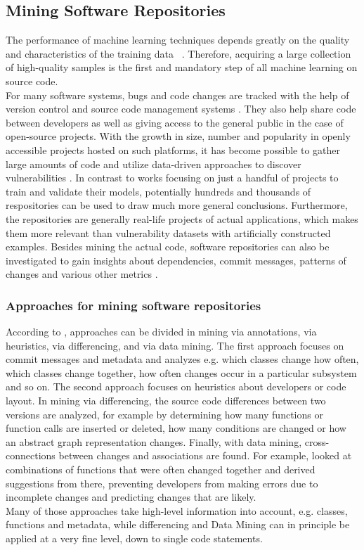 \documentclass[
a4paper,
pagesize,
pdftex,
12pt,
twoside, %
BCOR=5mm, %
ngerman,
fleqn,
final,
]{scrartcl}
\begin{document}
	\subsection{Mining Software Repositories}\label{Mining-Software-Repositories}
	The performance of machine learning techniques depends greatly on the quality and characteristics of the training data ~\cite{Pang.2015}. Therefore, acquiring a large collection of high-quality samples is the first and mandatory step of all machine learning on source code.\\
	For many software systems, bugs and code changes are tracked with the help of version control and source code management systems \cite{Zhou.2017}. They also help share code between developers as well as giving access to the general public in the case of open-source projects. With the growth in size, number and popularity in openly accessible projects hosted on such platforms, it has become possible to gather large amounts of code and utilize data-driven approaches to discover vulnerabilities \cite{Russell.2018}. In contrast to works focusing on just a handful of projects to train and validate their models, potentially hundreds and thousands of respositories can be used to draw much more general conclusions. Furthermore, the repositories are generally real-life projects of actual applications, which makes them more relevant than vulnerability datasets with artificially constructed examples. Besides mining the actual code, software repositories can also be investigated to gain insights about dependencies, commit messages, patterns of changes and various other metrics \citep{Liu.2018}.\\
	\subsubsection{Approaches for mining software repositories}
	According to \cite{Kagdi.2005}, approaches can be divided in mining via annotations, via heuristics, via differencing, and via data mining. The first approach focuses on commit messages and metadata and analyzes e.g. which classes change how often, which classes change together, how often changes occur in a particular subsystem and so on. The second approach focuses on heuristics about developers or code layout. In mining via differencing, the source code differences between two versions are analyzed, for example by determining how many functions or function calls are inserted or deleted, how many conditions are changed or how an abstract graph representation changes. Finally, with data mining, cross-connections between changes and associations are found. For example, \cite{Zimmermann.2005} looked at combinations of functions that were often changed together and derived suggestions from there, preventing developers from making errors due to incomplete changes and predicting changes that are likely.\\
	Many of those approaches take high-level information into account, e.g. classes, functions and metadata, while differencing and Data Mining can in principle be applied at a very fine level, down to single code statements.
\end{document}
